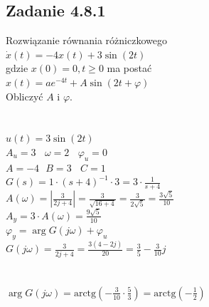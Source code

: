 \pagebreak
\subsection*{Zadanie 4.8.1} {\color{darkgray}
	Rozwiązanie równania różniczkowego\\
	$\dot{x}(t)=-4x(t)+3\sin(2t)$\\
	gdzie $x(0)=0, t \geqslant 0$ ma postać\\
	$x(t)=ae^{-4t}+A\sin(2t+\varphi)$\\
	Obliczyć $A$ i $\varphi$.\\
}\lineh
\\\\
$u(t)=3\sin(2t)$\\
$A_u=3 \ \ \ \ \omega = 2 \ \ \ \ \varphi_u=0$\\
$A=-4 \ \ \ B=3 \ \ \ \ C=1$\\
$G(s)=1\cdot(s+4)^{-1} \cdot 3=3 \cdot \frac{1}{s+4}$\\
$A(\omega)=|\frac{3}{2j+4}|=\frac{3}{\sqrt{16+4}}=\frac{3}{2\sqrt{5}}=\frac{3\sqrt{5}}{10}$\\
$A_y=3\cdot A(\omega)=\frac{9\sqrt{5}}{10}$\\
$\varphi_y=\arg G(j\omega)+\varphi_u$\\
$G(j\omega)=\frac{3}{2j+4}=\frac{3(4-2j)}{20}=\frac 3 5 -\frac{3}{10}j$\\
\\\\
$\arg G(j\omega)=\text{arctg}(-\frac{3}{10} \cdot \frac{5}{3})=\boxed{\text{arctg}(-\frac{1}{2})}$\\


